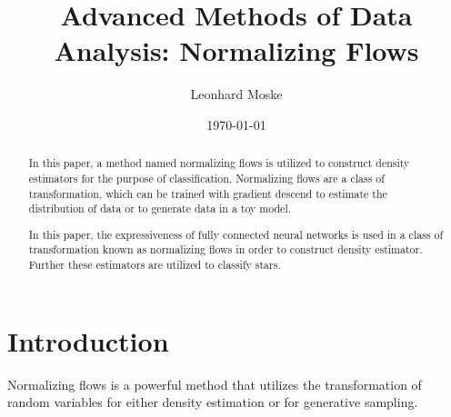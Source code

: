 \documentclass[%
 reprint,
 amsmath,amssymb,
 aps,
]{revtex4-2}
\begin{document}
\title{Advanced Methods of Data Analysis: Normalizing Flows}%

\author{Leonhard Moske}



\date{\today}%

\begin{abstract}

In this paper, a method named normalizing flows is utilized to construct density estimators for the purpose of classification. Normalizing flows are a class of transformation, which can be trained with gradient descend to estimate the distribution of data or to generate data in a toy model.

In this paper, the expressiveness of fully connected neural networks is used in a class of transformation known as normalizing flows in order to construct density estimator. Further these estimators are utilized to classify stars.

\end{abstract}
\maketitle


\section{Introduction}
Normalizing flows is a powerful method that utilizes the transformation of random variables for either density estimation or for generative sampling.
\end{document}
